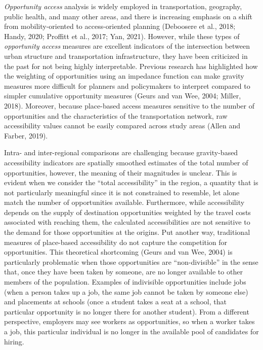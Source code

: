 \documentclass[]{elsarticle} %
\begin{document}
\emph{Opportunity access} analysis is widely employed in transportation,
geography, public health, and many other areas, and there is increasing
emphasis on a shift from mobility-oriented to access-oriented planning
(Deboosere et al., 2018; Handy, 2020; Proffitt et al., 2017; Yan, 2021).
However, while these types of \emph{opportunity access} measures are
excellent indicators of the intersection between urban structure and
transportation infrastructure, they have been criticized in the past for
not being highly interpretable. Previous research has highlighted how
the weighting of opportunities using an impedance function can make
gravity measures more difficult for planners and policymakers to
interpret compared to simpler cumulative opportunity measures (Geurs and
van Wee, 2004; Miller, 2018). Moreover, because place-based access
measures sensitive to the number of opportunities and the
characteristics of the transportation network, raw accessibility values
cannot be easily compared across study areas (Allen and Farber, 2019).

Intra- and inter-regional comparisons are challenging because
gravity-based accessibility indicators are spatially smoothed estimates
of the total number of opportunities, however, the meaning of their
magnitudes is unclear. This is evident when we consider the ``total
accessibility'' in the region, a quantity that is not particularly
meaningful since it is not constrained to resemble, let alone match the
number of opportunities available. Furthermore, while accessibility
depends on the supply of destination opportunities weighted by the
travel costs associated with reaching them, the calculated
accessibilities are not sensitive to the demand for those opportunities
at the origins. Put another way, traditional measures of place-based
accessibility do not capture the competition for opportunities. This
theoretical shortcoming (Geurs and van Wee, 2004) is particularly
problematic when those opportunities are ``non-divisible'' in the sense
that, once they have been taken by someone, are no longer available to
other members of the population. Examples of indivisible opportunities
include jobs (when a person takes up a job, the same job cannot be taken
by someone else) and placements at schools (once a student takes a seat
at a school, that particular opportunity is no longer there for another
student). From a different perspective, employers may see workers as
opportunities, so when a worker takes a job, this particular individual
is no longer in the available pool of candidates for hiring.
\end{document}
